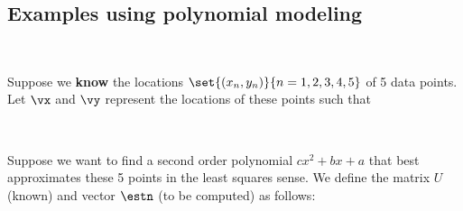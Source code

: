 \subsection{Examples using polynomial modeling}
\begin{example}
\mbox{}\\
\begin{minipage}{\tw-80mm}
Suppose we {\bf know} the locations
$\set{(x_n,y_n)}{n=1,2,3,4,5}$ of 5 data points.
Let $\vx$ and $\vy$ represent the locations of these points such that
\end{minipage}
\qquad
\tboxc{$
   \vx \eqd
   \left[\begin{array}{l}
      x_1  \\
      x_2  \\
      x_3  \\
      x_4  \\
      x_5
   \end{array}\right]
   \qquad
   \vy \eqd
   \left[\begin{array}{l}
      y_1  \\
      y_2  \\
      y_3  \\
      y_4  \\
      y_5
   \end{array}\right]
$}
\\
\begin{minipage}{\tw-80mm}
Suppose we want to find a second order polynomial
  $c x^2 + bx + a$
that best approximates
these 5 points in the least squares sense.
We define the matrix $U$ (known) and vector $\estn$ (to be computed)
as follows:\footnotemark
\end{minipage}
\qquad
\tboxc{$
   U^H \eqd
   \mcom{
   \left[\begin{array}{lll}
      1  & x_1 & x_1^2  \\
      1  & x_2 & x_2^2  \\
      1  & x_3 & x_3^2  \\
      1  & x_4 & x_4^2  \\
      1  & x_5 & x_5^2
   \end{array}\right]
   }{Vandermonde matrix}
   \qquad
   \estn \eqd
   \left[\begin{array}{l}
      a  \\

\end{array}}
\end{example}
